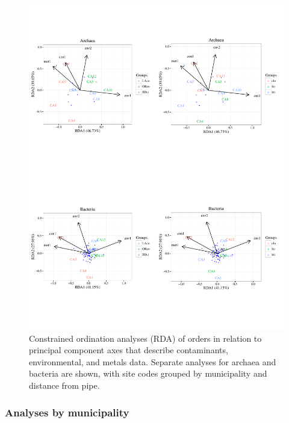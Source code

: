 \documentclass[letterpaper,12pt]{article}\usepackage[]{graphicx}\usepackage[]{color}
\newenvironment{knitrout}{}{} %
\begin{document}
\begin{knitrout}
\color{fgcolor}\begin{figure}[!ht]

{\centering \includegraphics[width=\textwidth]{figs/unnamed-chunk-7-1} 

}

\caption[Constrained ordination analyses (RDA) of orders in relation to principal component axes that describe contaminants, environmental, and metals data]{Constrained ordination analyses (RDA) of orders in relation to principal component axes that describe contaminants, environmental, and metals data.  Separate analyses for archaea and bacteria are shown, with site codes grouped by municipality and distance from pipe.}\label{fig:unnamed-chunk-7}
\end{figure}


\end{knitrout}
\clearpage

\subsubsection{Analyses by municipality}
\end{document}

